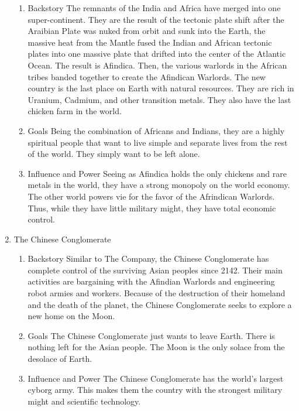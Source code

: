 \documentclass[12pt]{article}
\begin{document}
\begin{enumerate}
\begin{enumerate}
\item Backstory
\label{sec:org9555611}
The remnants of the India and Africa have merged into one super-continent. They are the result of the tectonic plate shift after the Araibian Plate was nuked from orbit and sunk into the Earth, the massive heat from the Mantle fused the Indian and African tectonic plates into one massive plate that drifted into the center of the Atlantic Ocean. The result is Afindica. Then, the various warlords in the African tribes banded together to create the Afindican Warlords. The new country is the last place on Earth with natural resources. They are rich in Uranium, Cadmium, and other transition metals. They also have the last chicken farm in the world.

\item Goals
\label{sec:org194a8e7}
Being the combination of Africans and Indians, they are a highly spiritual people that want to live simple and separate lives from the rest of the world. They simply want to be left alone.

\item Influence and Power
\label{sec:org9205f0f}
Seeing as Afindica holds the only chickens and rare metals in the world, they have a strong monopoly on the world economy. The other world powers vie for the favor of the Afrindican Warlords. Thus, while they have little military might, they have total economic control.
\end{enumerate}

\item The Chinese Conglomerate
\label{sec:orge016c65}

\begin{enumerate}
\item Backstory
\label{sec:org492792c}
Similar to The Company, the Chinese Conglomerate has complete control of the surviving Asian peoples since 2142. Their main activities are bargaining with the Afindian Warlords and engineering robot armies and workers. Because of the destruction of their homeland and the death of the planet, the Chinese Conglomerate seeks to explore a new home on the Moon.

\item Goals
\label{sec:orgc9122bd}
The Chinese Conglomerate just wants to leave Earth. There is nothing left for the Asian people. The Moon is the only solace from the desolace of Earth.

\item Influence and Power
\label{sec:orgfb2c61a}
The Chinese Conglomerate has the world's largest cyborg army. This makes them the country with the strongest military might and scientific technology.
\end{enumerate}


\end{enumerate}
\end{document}
